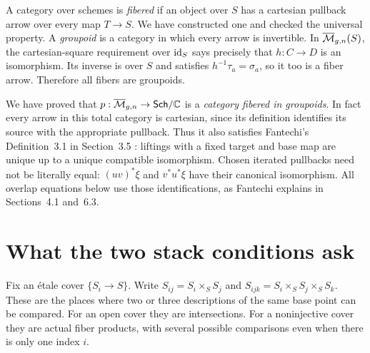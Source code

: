 A category over schemes is \emph{fibered} if an object over $S$
has a cartesian pullback arrow over every map $T\to S$. We have
constructed one and checked the universal property. A
\emph{groupoid} is a category in which every arrow is invertible.
In $\overline{\mathcal M}_{g,n}(S)$, the cartesian-square requirement over $\operatorname{id}_S$ says
precisely that $h:C\to D$ is an isomorphism. Its inverse is over
$S$ and satisfies $h^{-1}\tau_a=\sigma_a$, so it too is a fiber
arrow. Therefore all fibers are groupoids.

We have proved that $p:\overline{\mathcal M}_{g,n}\to\mathsf{Sch}/\mathbb C$ is a \emph{category
fibered in groupoids}. In fact every arrow in this total category
is cartesian, since its definition identifies its source with the
appropriate pullback. Thus it also satisfies Fantechi's
Definition~3.1 in Section~3.5 \cite{Fantechi}: liftings with a
fixed target and base map are unique up to a unique compatible
isomorphism. Chosen iterated pullbacks need not be literally equal:
$(uv)^*\xi$ and $v^*u^*\xi$ have their canonical isomorphism.
All overlap equations below use those identifications, as Fantechi
explains in Sections~4.1 and~6.3.


\section{What the two stack conditions ask}\label{sec:fantechi}

Fix an \'etale cover $\{S_i\to S\}$. Write
$S_{ij}=S_i\times_SS_j$ and
$S_{ijk}=S_i\times_SS_j\times_SS_k$. These are the places where
two or three descriptions of the same base point can be compared.
For an open cover they are intersections. For a noninjective
cover they are actual fiber products, with several possible
comparisons even when there is only one index $i$.

